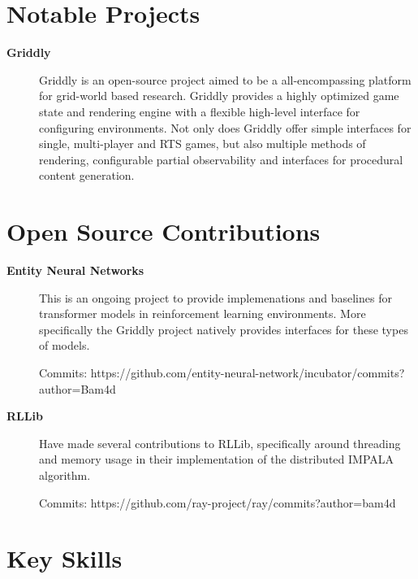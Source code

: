 \documentclass[a4paper]{article}
\def\tightlist{}
\begin{document}
\section{Notable Projects}\label{notable-personal-projects}

\begin{description}
\tightlist

\item[\textbf{Griddly}]
Griddly is an open-source project aimed to be a all-encompassing platform for grid-world based research. 
    Griddly provides a highly optimized game state and rendering engine with a flexible high-level interface for configuring environments. 
    Not only does Griddly offer simple interfaces for single, multi-player and RTS games, but also multiple methods of rendering, configurable partial observability and interfaces for procedural content generation.

\end{description}

\section{Open Source Contributions}\label{open-source-contributions}

\begin{description}
\tightlist
\item[\textbf{Entity Neural Networks}]
This is an ongoing project to provide implemenations and baselines for transformer models in reinforcement learning environments. More specifically the Griddly project natively provides interfaces for these types of models.

Commits: https://github.com/entity-neural-network/incubator/commits?author=Bam4d
\item[\textbf{RLLib}]
Have made several contributions to RLLib, specifically around threading and memory usage in their implementation of the distributed IMPALA algorithm.

Commits: https://github.com/ray-project/ray/commits?author=bam4d

\end{description}

\section{Key Skills}\label{key-skills}
\end{document}
